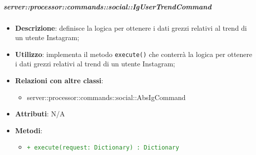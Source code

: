         \subparagraph{server::processor::commands::social::IgUserTrendCommand} %
        \label{subp:bdsm_app_server_processor_commands_social_igusertrendcommand}
        \begin{itemize}
          \item \textbf{Descrizione}: definisce la logica per ottenere i dati grezzi relativi al trend di un utente Instagram;
          \item \textbf{Utilizzo}: implementa il metodo \texttt{execute()} che conterrà la logica per ottenere i dati grezzi relativi al trend di un utente Instagram;
          \item \textbf{Relazioni con altre classi}:
            \begin{itemize}
              \item server::processor::commands::social::AbsIgCommand
            \end{itemize}
					\item \textbf{Attributi}: N/A
					\item \textbf{Metodi}:
        	\begin{itemize}
          		\item \textcolor{forestgreen}{\texttt{+ execute(request: Dictionary) : Dictionary}}
        	\end{itemize}
        \end{itemize}

